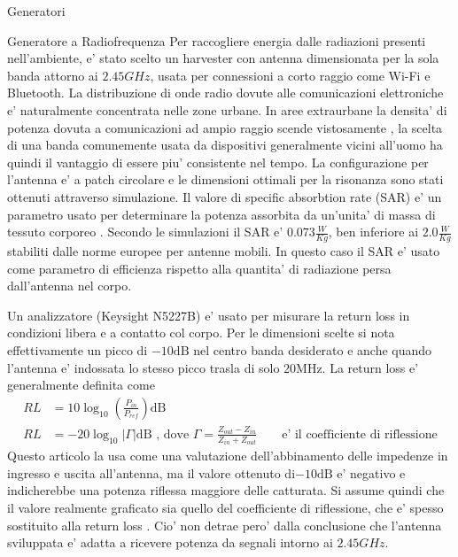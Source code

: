 \begin{section}{Generatori}
    \begin{subsection}{Generatore a Radiofrequenza}
        Per raccogliere energia dalle radiazioni presenti nell'ambiente, e' stato scelto un harvester con antenna dimensionata per la sola banda attorno ai \(2.45GHz\), usata per connessioni a corto raggio come Wi-Fi e Bluetooth. La distribuzione di onde radio dovute alle comunicazioni elettroniche e' naturalmente concentrata nelle zone urbane. In aree extraurbane la densita' di potenza dovuta a comunicazioni ad ampio raggio scende vistosamente \cite{ibrahimRadioFrequencyEnergy2022}, la scelta di una banda comunemente usata da dispositivi generalmente vicini all'uomo ha quindi il vantaggio di essere piu' consistente nel tempo. La configurazione per l'antenna e' a patch circolare e le dimensioni ottimali per la risonanza sono stati ottenuti attraverso simulazione. Il valore di specific absorbtion rate (SAR) e' un parametro usato per determinare la potenza assorbita da un'unita' di massa di tessuto corporeo \cite{vallozzi26LatestDevelopments2016}. Secondo le simulazioni il SAR e' \(0.073\frac{W}{Kg}\), ben inferiore ai \(2.0\frac{W}{Kg}\) stabiliti dalle norme europee per antenne mobili. In questo caso il SAR e' usato come parametro di efficienza rispetto alla quantita' di radiazione persa dall'antenna nel corpo. 


        {\color{red}
        Un analizzatore (Keysight N5227B) e' usato per misurare la return loss in condizioni libera e a contatto col corpo. Per le dimensioni scelte si nota effettivamente un picco di \(-10\mathrm{dB}\) nel centro banda desiderato e anche quando l'antenna e' indossata lo stesso picco trasla di solo \(20\mathrm{MHz}\).
        La return loss e' generalmente definita come 
        \begin{equation*}
            \begin{aligned}
            RL&=10\log_{10}\left( \frac{P_{in}}{P_{ref}} \right) \mathrm{dB}\\
            RL&=-20\log_{10}\left|\Gamma\right|\mathrm{dB} \textrm{ , dove }\Gamma=\frac{Z_{out}-Z_{in}}{Z_{in}+Z_{out}}\hspace{2em} \textrm{e' il coefficiente di riflessione}
            \end{aligned}
        \end{equation*}
        Questo articolo la usa come una valutazione dell'abbinamento delle impedenze in ingresso e uscita all'antenna, ma il valore ottenuto di\(-10\mathrm{dB}\) e' negativo e indicherebbe una potenza riflessa maggiore delle catturata. Si assume quindi che il valore realmente graficato sia quello del coefficiente di riflessione, che e' spesso sostituito alla return loss \cite{birdDefinitionMisuseReturn2009}. Cio' non detrae pero' dalla conclusione che l'antenna sviluppata e' adatta a ricevere potenza da segnali intorno ai \(2.45GHz\).
        }


\end{subsection}
\end{section}
